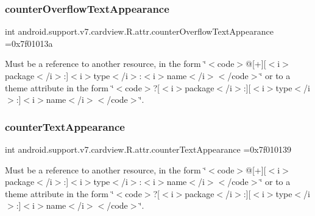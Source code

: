\subsubsection{\texorpdfstring{counter\+Overflow\+Text\+Appearance}{counterOverflowTextAppearance}}
{\footnotesize\ttfamily int android.\+support.\+v7.\+cardview.\+R.\+attr.\+counter\+Overflow\+Text\+Appearance =0x7f01013a\hspace{0.3cm}{\ttfamily [static]}}

Must be a reference to another resource, in the form \char`\"{}$<$code$>$@\mbox{[}+\mbox{]}\mbox{[}$<$i$>$package$<$/i$>$\+:\mbox{]}$<$i$>$type$<$/i$>$\+:$<$i$>$name$<$/i$>$$<$/code$>$\char`\"{} or to a theme attribute in the form \char`\"{}$<$code$>$?\mbox{[}$<$i$>$package$<$/i$>$\+:\mbox{]}\mbox{[}$<$i$>$type$<$/i$>$\+:\mbox{]}$<$i$>$name$<$/i$>$$<$/code$>$\char`\"{}. \mbox{\label{classandroid_1_1support_1_1v7_1_1cardview_1_1R_1_1attr_aecc7241edce89e54265193066cf7bd25}} 
\subsubsection{\texorpdfstring{counter\+Text\+Appearance}{counterTextAppearance}}
{\footnotesize\ttfamily int android.\+support.\+v7.\+cardview.\+R.\+attr.\+counter\+Text\+Appearance =0x7f010139\hspace{0.3cm}{\ttfamily [static]}}

Must be a reference to another resource, in the form \char`\"{}$<$code$>$@\mbox{[}+\mbox{]}\mbox{[}$<$i$>$package$<$/i$>$\+:\mbox{]}$<$i$>$type$<$/i$>$\+:$<$i$>$name$<$/i$>$$<$/code$>$\char`\"{} or to a theme attribute in the form \char`\"{}$<$code$>$?\mbox{[}$<$i$>$package$<$/i$>$\+:\mbox{]}\mbox{[}$<$i$>$type$<$/i$>$\+:\mbox{]}$<$i$>$name$<$/i$>$$<$/code$>$\char`\"{}. \mbox{\label{classandroid_1_1support_1_1v7_1_1cardview_1_1R_1_1attr_aacada8734410b34e167ba3c763dc7be6}} 

